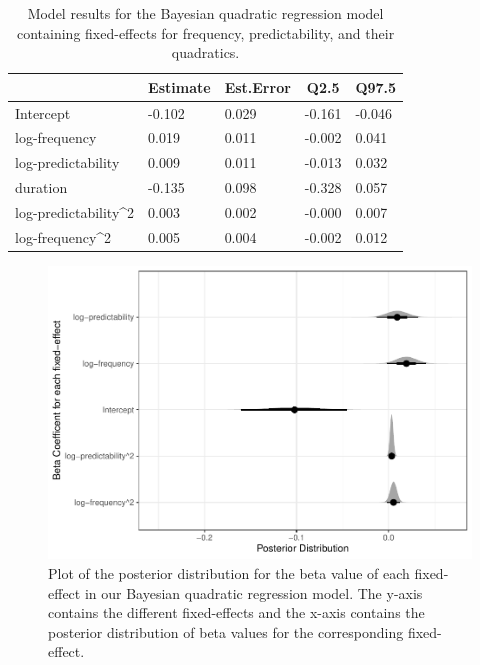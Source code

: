 \documentclass[
  man,floatsintext]{apa6}
\begin{document}
\begin{table}[H]

\begin{center}
\begin{threeparttable}

\caption{\label{tab:brmsQuadraticNoInter}Model results for the Bayesian quadratic regression model containing fixed-effects for frequency, predictability, and their quadratics.}

\begin{tabular}{lllll}
\toprule
 & \multicolumn{1}{c}{Estimate} & \multicolumn{1}{c}{Est.Error} & \multicolumn{1}{c}{Q2.5} & \multicolumn{1}{c}{Q97.5}\\
\midrule
Intercept & -0.102 & 0.029 & -0.161 & -0.046\\
log-frequency & 0.019 & 0.011 & -0.002 & 0.041\\
log-predictability & 0.009 & 0.011 & -0.013 & 0.032\\
duration & -0.135 & 0.098 & -0.328 & 0.057\\
log-predictability\textasciicircum{}2 & 0.003 & 0.002 & -0.000 & 0.007\\
log-frequency\textasciicircum{}2 & 0.005 & 0.004 & -0.002 & 0.012\\
\bottomrule
\end{tabular}

\end{threeparttable}
\end{center}

\end{table}

\begin{figure}

{\centering \includegraphics[width=0.8\linewidth]{write-up_files/figure-latex/posteriorplotFullQuadratic-1} 

}

\caption{Plot of the posterior distribution for the beta value of each fixed-effect in our Bayesian quadratic regression model. The y-axis contains the different fixed-effects and the x-axis contains the posterior distribution of beta values for the corresponding fixed-effect.}\label{fig:posteriorplotFullQuadratic}
\end{figure}
\end{document}
